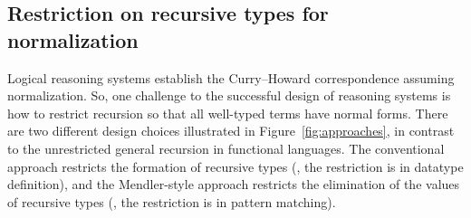 
\subsection{Restriction on recursive types for normalization}
\label{sec:intro:concpets:recursive}
Logical reasoning systems establish
the Curry--Howard correspondence assuming normalization.
So, one challenge to the successful design of reasoning systems
is how to restrict recursion so that all well-typed terms have normal forms.
There are two different design choices illustrated
in Figure~\ref{fig:approaches}, in contrast to
the unrestricted general recursion in functional languages.
The conventional approach restricts the formation of recursive types
(\ie, the restriction is in datatype definition), and
the Mendler-style approach restricts the elimination of the values of
recursive types (\ie, the restriction is in pattern matching).





